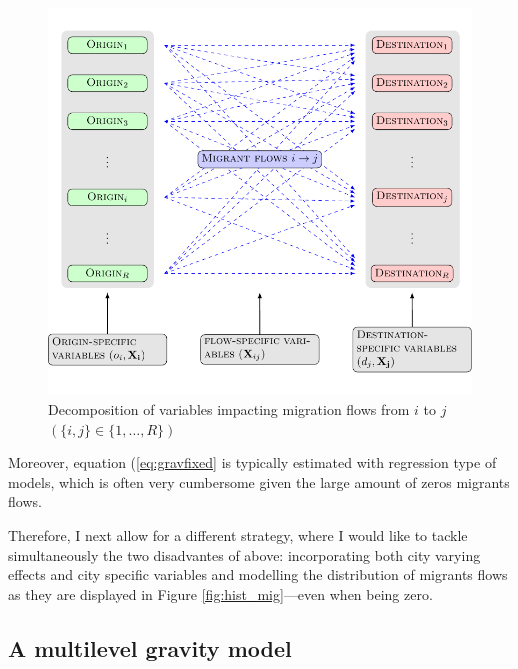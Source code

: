 \documentclass[fleqn,10pt]{SelfArx} %
\begin{document}
        \begin{figure}[ht]\centering %
          \includegraphics[width=\linewidth]{../fig/gravity_network.pdf}
          \caption{Decomposition of variables impacting migration flows from $i$ to $j$ $\left(\{i,j\} \in \{1,\ldots, R\}\right)$}
            \label{fig:gravity_network}
          \end{figure}
          
        Moreover, equation
        (\ref{eq:gravfixed} is typically estimated with regression
        type of models, which is often very cumbersome given the large
        amount of zeros migrants flows.

        Therefore, I next allow for a different strategy, where I
        would like to tackle simultaneously the two disadvantes of above:
        incorporating both city varying effects and city specific variables and
        modelling the distribution of migrants flows as they are
        displayed in Figure \ref{fig:hist_mig}---even when being zero.

        \subsection{A multilevel gravity model}
\end{document}
